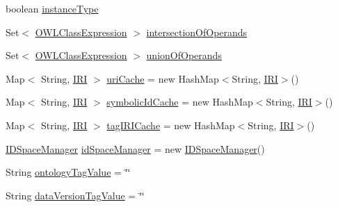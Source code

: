 \begin{DoxyCompactItemize}
\item 
boolean \hyperlink{classorg_1_1coode_1_1owlapi_1_1obo_1_1parser_1_1_o_b_o_consumer_a2b558ff014dcb0c45afb14ac4e825963}{instance\-Type}
\item 
Set$<$ \hyperlink{interfaceorg_1_1semanticweb_1_1owlapi_1_1model_1_1_o_w_l_class_expression}{O\-W\-L\-Class\-Expression} $>$ \hyperlink{classorg_1_1coode_1_1owlapi_1_1obo_1_1parser_1_1_o_b_o_consumer_a7512375ca2dc97afeee829c15d00a519}{intersection\-Of\-Operands}
\item 
Set$<$ \hyperlink{interfaceorg_1_1semanticweb_1_1owlapi_1_1model_1_1_o_w_l_class_expression}{O\-W\-L\-Class\-Expression} $>$ \hyperlink{classorg_1_1coode_1_1owlapi_1_1obo_1_1parser_1_1_o_b_o_consumer_aa613010064fba7f1772b92441e5e39d0}{union\-Of\-Operands}
\item 
Map$<$ String, \hyperlink{classorg_1_1semanticweb_1_1owlapi_1_1model_1_1_i_r_i}{I\-R\-I} $>$ \hyperlink{classorg_1_1coode_1_1owlapi_1_1obo_1_1parser_1_1_o_b_o_consumer_a99cf51a43536618582115911274fec53}{uri\-Cache} = new Hash\-Map$<$String, \hyperlink{classorg_1_1semanticweb_1_1owlapi_1_1model_1_1_i_r_i}{I\-R\-I}$>$()
\item 
Map$<$ String, \hyperlink{classorg_1_1semanticweb_1_1owlapi_1_1model_1_1_i_r_i}{I\-R\-I} $>$ \hyperlink{classorg_1_1coode_1_1owlapi_1_1obo_1_1parser_1_1_o_b_o_consumer_a8c917f8cbab6350d6ccb29ecb1ffd07a}{symbolic\-Id\-Cache} = new Hash\-Map$<$String, \hyperlink{classorg_1_1semanticweb_1_1owlapi_1_1model_1_1_i_r_i}{I\-R\-I}$>$()
\item 
Map$<$ String, \hyperlink{classorg_1_1semanticweb_1_1owlapi_1_1model_1_1_i_r_i}{I\-R\-I} $>$ \hyperlink{classorg_1_1coode_1_1owlapi_1_1obo_1_1parser_1_1_o_b_o_consumer_ab81d2c163053dd9ee1232d3afdcf6494}{tag\-I\-R\-I\-Cache} = new Hash\-Map$<$String, \hyperlink{classorg_1_1semanticweb_1_1owlapi_1_1model_1_1_i_r_i}{I\-R\-I}$>$()
\item 
\hyperlink{classorg_1_1coode_1_1owlapi_1_1obo_1_1parser_1_1_i_d_space_manager}{I\-D\-Space\-Manager} \hyperlink{classorg_1_1coode_1_1owlapi_1_1obo_1_1parser_1_1_o_b_o_consumer_aa81b9931e70ca6430518a2538ab87f46}{id\-Space\-Manager} = new \hyperlink{classorg_1_1coode_1_1owlapi_1_1obo_1_1parser_1_1_i_d_space_manager}{I\-D\-Space\-Manager}()
\item 
String \hyperlink{classorg_1_1coode_1_1owlapi_1_1obo_1_1parser_1_1_o_b_o_consumer_a991771994ca422ffa98eb5ed010c22cb}{ontology\-Tag\-Value} = \char`\"{}\char`\"{}
\item 
String \hyperlink{classorg_1_1coode_1_1owlapi_1_1obo_1_1parser_1_1_o_b_o_consumer_a6de5aa6acfa2a5a1175acae375c27f69}{data\-Version\-Tag\-Value} = \char`\"{}\char`\"{}
\end{DoxyCompactItemize}
